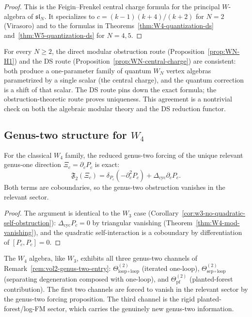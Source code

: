 \begin{proof}
This is the Feigin--Frenkel central charge formula for the principal
$W$-algebra of $\mathfrak{sl}_N$. It specializes to $c = (k-1)(k+4)/(k+2)$
for $N=2$ (Virasoro) and to the formulas in
Theorems~\ref{thm:W4-quantization-ds} and~\ref{thm:W5-quantization-ds}
for $N=4,5$.
\end{proof}

\begin{remark}
For every $N \ge 2$, the direct modular obstruction route
(Proposition~\ref{prop:WN-H1}) and the DS route
(Proposition~\ref{prop:WN-central-charge}) are consistent:
both produce a one-parameter family of quantum $W_N$ vertex algebras
parametrized by a single scalar (the central charge), and the quantum
correction is a shift of that scalar. The DS route pins down the
exact formula; the obstruction-theoretic route proves uniqueness.
This agreement is a nontrivial check on both the algebraic modular
theory and the DS reduction functor.
\end{remark}

\subsection{Genus-two structure for $W_4$}

\begin{proposition}
For the classical $W_4$ family, the reduced genus-two forcing of the
unique relevant genus-one direction $\Xi_c = \partial_c P_c$ is exact:
\[
\mathfrak{F}_2(\Xi_c)
=
\delta_{P_c}(-\partial_c^2 P_c) + \Delta_{\mathrm{cyc}}\partial_c P_c.
\]
Both terms are coboundaries, so the genus-two obstruction vanishes
in the relevant sector.
\end{proposition}

\begin{proof}
The argument is identical to the $W_3$ case
(Corollary~\ref{cor:w3-no-quadratic-self-obstruction}):
$\Delta_{\mathrm{cyc}} P_c = 0$ by triangular vanishing
(Theorem~\ref{thm:W4-mod-vanishing}), and the quadratic
self-interaction is a coboundary by differentiation of
$[P_c, P_c] = 0$.
\end{proof}

\begin{remark}
The $W_4$ algebra, like $W_3$, exhibits all three genus-two channels
of Remark~\ref{rem:vol2-genus-two-entry}:
$\Theta^{(2)}_{\mathrm{loop}\circ\mathrm{loop}}$ (iterated one-loop),
$\Theta^{(2)}_{\mathrm{sep}\circ\mathrm{loop}}$ (separating degeneration
composed with one-loop), and
$\Theta^{(2)}_{\mathrm{pf}}$ (planted-forest contribution).
The first two channels are forced to vanish in the relevant sector
by the genus-two forcing proposition. The third channel is the
rigid planted-forest/log-FM sector, which carries the
genuinely new genus-two information.
\end{remark}


